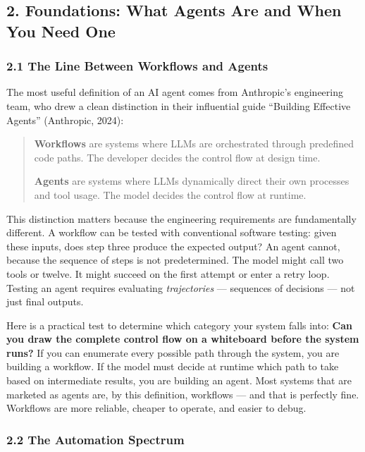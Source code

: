 \documentclass[11pt, a4paper]{article}
\begin{document}
\hypertarget{foundations-what-agents-are-and-when-you-need-one}{%
\subsection{2. Foundations: What Agents Are and When You Need
One}\label{foundations-what-agents-are-and-when-you-need-one}}

\hypertarget{the-line-between-workflows-and-agents}{%
\subsubsection{2.1 The Line Between Workflows and
Agents}\label{the-line-between-workflows-and-agents}}

The most useful definition of an AI agent comes from Anthropic's
engineering team, who drew a clean distinction in their influential
guide ``Building Effective Agents'' (Anthropic, 2024):

\begin{quote}
\textbf{Workflows} are systems where LLMs are orchestrated through
predefined code paths. The developer decides the control flow at design
time.

\textbf{Agents} are systems where LLMs dynamically direct their own
processes and tool usage. The model decides the control flow at runtime.
\end{quote}

This distinction matters because the engineering requirements are
fundamentally different. A workflow can be tested with conventional
software testing: given these inputs, does step three produce the
expected output? An agent cannot, because the sequence of steps is not
predetermined. The model might call two tools or twelve. It might
succeed on the first attempt or enter a retry loop. Testing an agent
requires evaluating \emph{trajectories} --- sequences of decisions ---
not just final outputs.

Here is a practical test to determine which category your system falls
into: \textbf{Can you draw the complete control flow on a whiteboard
before the system runs?} If you can enumerate every possible path
through the system, you are building a workflow. If the model must
decide at runtime which path to take based on intermediate results, you
are building an agent. Most systems that are marketed as agents are, by
this definition, workflows --- and that is perfectly fine. Workflows are
more reliable, cheaper to operate, and easier to debug.

\hypertarget{the-automation-spectrum}{%
\subsubsection{2.2 The Automation
Spectrum}\label{the-automation-spectrum}}
\end{document}

